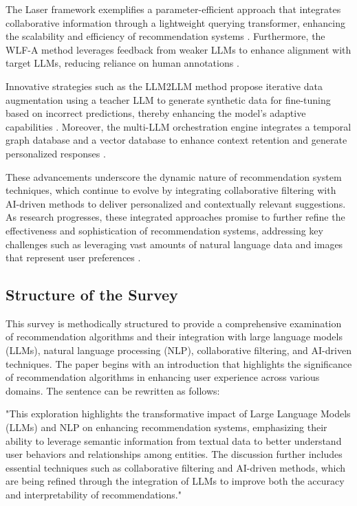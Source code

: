 The Laser framework exemplifies a parameter-efficient approach that integrates collaborative information through a lightweight querying transformer, enhancing the scalability and efficiency of recommendation systems \cite{zhang2024laserparameterefficientllmbituning}. Furthermore, the WLF-A method leverages feedback from weaker LLMs to enhance alignment with target LLMs, reducing reliance on human annotations \cite{tao2024weakllmsecretlystrong}.



Innovative strategies such as the LLM2LLM method propose iterative data augmentation using a teacher LLM to generate synthetic data for fine-tuning based on incorrect predictions, thereby enhancing the model's adaptive capabilities \cite{lee2024llm2llmboostingllmsnovel}. Moreover, the multi-LLM orchestration engine integrates a temporal graph database and a vector database to enhance context retention and generate personalized responses \cite{rasal2024multillmorchestrationenginepersonalized}.



These advancements underscore the dynamic nature of recommendation system techniques, which continue to evolve by integrating collaborative filtering with AI-driven methods to deliver personalized and contextually relevant suggestions. As research progresses, these integrated approaches promise to further refine the effectiveness and sophistication of recommendation systems, addressing key challenges such as leveraging vast amounts of natural language data and images that represent user preferences \cite{tian2024mmrecllmbasedmultimodal}.



\subsection{Structure of the Survey} \label{subsec:Structure of the Survey}



This survey is methodically structured to provide a comprehensive examination of recommendation algorithms and their integration with large language models (LLMs), natural language processing (NLP), collaborative filtering, and AI-driven techniques. The paper begins with an introduction that highlights the significance of recommendation algorithms in enhancing user experience across various domains. The sentence can be rewritten as follows:

"This exploration highlights the transformative impact of Large Language Models (LLMs) and NLP on enhancing recommendation systems, emphasizing their ability to leverage semantic information from textual data to better understand user behaviors and relationships among entities. The discussion further includes essential techniques such as collaborative filtering and AI-driven methods, which are being refined through the integration of LLMs to improve both the accuracy and interpretability of recommendations." \cite{vats2024exploring,ren2024representation,chu2023leveraging}



